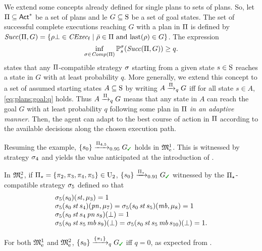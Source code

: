 We extend some concepts already defined for single plans to sets of
plans.  So, let $\plans\subseteq\Act^*$ be a set of plans and le
$G\subseteq\S$ be a set of goal states.  The set of successful
complete executions reaching $G$ with a plan in $\plans$ is defined
by
$\Succ(\plans,G)=\{{\rho\complete\in\cexecf}\mid{\bar{\rho}\in\plans \text{ and } \last(\rho)\in G}\}$.
%
The expression
%
\begin{equation}\label{eq:plans:goal:q}
  \inf_{\strat \in\Comp(\plans)}\Prob^\strat_s(\Succ(\plans,G)) \geq q.
\end{equation}
%
states that any $\plans$-compatible strategy $\strat$
starting from a given state $s\in\S$ reaches a state in $G$ with at
least probability $q$.
%
More generally, we extend this concept to a set of assumed starting
states $A\subseteq\S$ by writing $A \reach{\plans}_q G$ iff for all
state $s\in A$, \cref{eq:plans:goal:q} holds.
%
Thus $A \reach{\plans}_q G$ means that any state in $A$ can reach the
goal $G$ with at least probability $q$ following some plan in $\plans$
\emph{in an adaptive manner}. Then, the agent can adapt to the best course of action in $\plans$ according to the available decisions along the chosen execution path.

\begin{example}\label{ex:running:plans-exec}
  Resuming the example, $\{s_0\}\reach{\plans_{4,5}}_{0.95}G_{\goal}$
  holds in $\modelex^1$.  This is witnessed by strategy $\strat_4$ and
  yields the value anticipated at the introduction of
  .

  In $\modelex^2$, if
  $\plans_{\star}=\{\plan_2,\plan_3,\plan_4,\plan_5\}\in\Unc_2$,
  ${\{s_0\}\reach{\plans_{\star}}_{0.91}G_{\goal}}$ witnessed
  by the $\plans_{\star}$-compatible strategy $\strat_5$ defined so that
  \[
  \begin{array}{l}
    \strat_5(s_0)(\stairs,\mu_3)=1\\
    \strat_5(s_0\,\stairs\,s_4)(\panic,\mu_7)=\strat_5(s_0\,\stairs\,s_5)(\mobile,\mu_8)=1\\
    \strat_5(s_0\,\stairs\,s_4\,\panic\,s_8)(\complete)=1\\
    \strat_5(s_0\,\stairs\,s_5\,\mobile\,s_9)(\complete)=
    \strat_5(s_0\,\stairs\,s_5\,\mobile\,s_{10})(\complete)=1.
  \end{array}
  \]
  
  For both $\modelex^1$ and $\modelex^2$,
  $\{s_0\}\reach{\{\plan_1\}}_qG_{\goal}$ iff $q=0$, as expected from
  .
\end{example}

